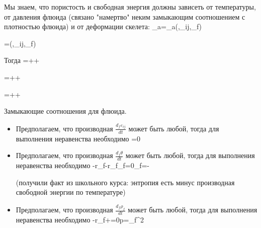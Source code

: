 \documentclass[main.tex]{subfiles}
\begin{document}
Мы знаем, что пористость и свободная энергия должны зависеть от температуры, от давления флюида (связано "намертво" неким замыкающим соотношением с плотностью флюида) и от деформации скелета:
\beq
\Psi_a=\Psi_a\left(\theta,\varepsilon_{ij},\rho_f\right)
\eeq

\beq
\varphi=\varphi\left(\theta,\varepsilon_{ij},\rho_f\right)
\eeq

Тогда
\beq
{}=++
\eeq

\beq
{}=++
\eeq

\beq
{}=\frac{\partial\varphi}{\partial\theta}++
\eeq

Замыкающие соотношения для флюида.

\begin{itemize}
\item Предполагаем, что производная $\displaystyle{}\frac{d_f\varepsilon_{ij}}{dt}$ может быть любой, тогда для выполнения неравенства необходимо
\beq\label{FirstFluid1}
=0
\eeq

\item Предполагаем, что производная $\displaystyle{}\frac{d_f\theta}{dt}$ может быть любой, тогда для выполнения неравенства необходимо 
\beq\label{FirstFluid2}
-r_f-r_f\eta_f=0\Rightarrow\eta_f=-
\eeq

(получили факт из школьного курса: энтропия есть минус производная свободной энергии по температуре)

\item Предполагаем, что производная $\displaystyle{}\frac{d_f\rho_f}{dt}$ может быть любой, тогда для выполнения неравенства необходимо 
\beq\label{FirstFluid3}
-r_f+=0\Rightarrow p=\rho_f^2
\eeq

\end{itemize}
\end{document}
